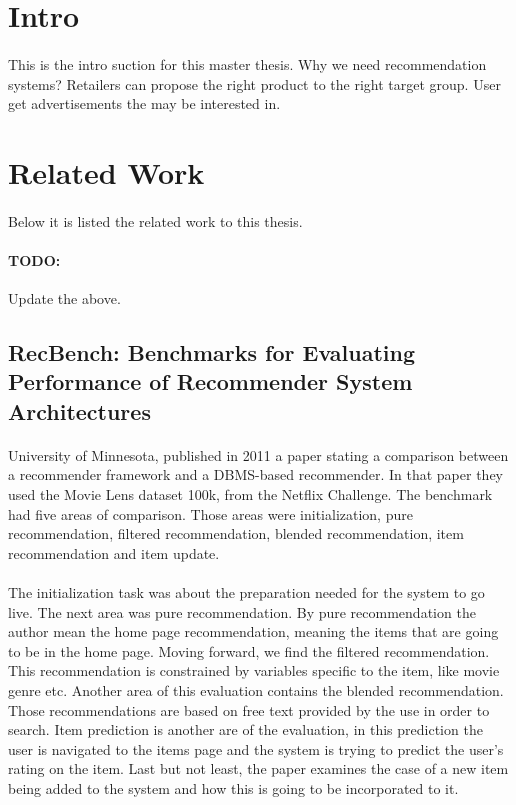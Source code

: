 \section{Intro}
\paragraph{} This is the intro suction for this master thesis.
Why we need recommendation systems? Retailers can propose the right product to the right target group.
User get advertisements the may be interested in.\cite{RecommenderSystems:2}


\section{Related Work}
\paragraph{} Below it is listed the related work to this thesis.
\paragraph{TODO:} Update the above.

\subsection{RecBench: Benchmarks for Evaluating Performance of Recommender System Architectures \cite{levandoski2011recbench}}
\paragraph{}University of Minnesota, published in 2011 a paper stating a comparison between a recommender framework and a DBMS-based recommender. In that paper they used the Movie Lens dataset 100k, from the Netflix Challenge. The benchmark had five areas of comparison. Those areas were initialization, pure recommendation, filtered recommendation, blended recommendation, item recommendation and item update.

\paragraph{}The initialization task was about the preparation needed for the system to go live. The next area was pure recommendation. By pure recommendation the author mean the home page recommendation, meaning the items that are going to be in the home page. Moving forward, we find the filtered recommendation. This recommendation is constrained by variables specific to the item, like movie genre etc. Another area of this evaluation contains the blended recommendation. Those recommendations are based on free text provided by the use in order to search. Item prediction is another are of the evaluation, in this prediction the user is navigated to the items page and the system is trying to predict the user's rating on the item. Last but not least, the paper examines the case of a new item being added to the system and how this is going to be incorporated to it.

